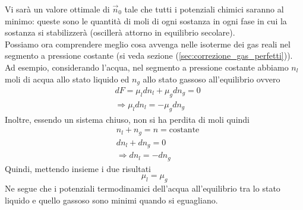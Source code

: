 \documentclass[10pt,a4paper]{article}
\begin{document}
Vi sarà un valore ottimale di $\vec{n}_0$ tale che tutti i potenziali chimici saranno al minimo: queste sono le quantità di moli di ogni sostanza in ogni fase in cui la sostanza si stabilizzerà (oscillerà attorno in equilibrio secolare).\\
Possiamo ora comprendere meglio cosa avvenga nelle isoterme dei gas reali nel segmento a pressione costante (si veda sezione (\ref{sec:correzione_gas_perfetti})). Ad esempio, considerando l'acqua, nel segmento a pressione costante abbiamo \(n_l\) moli di acqua allo stato liquido ed \(n_g\) allo stato gassoso all'equilibrio ovvero 
\begin{align*}
	&dF= \mu_l dn_l+ \mu_g dn_g = 0\\
	&\Rightarrow \mu_l dn_l = -\mu_g dn_g
\end{align*}
Inoltre, essendo un sistema chiuso, non si ha perdita di moli quindi 
\begin{align*}
	&n_l + n_g = n = \text{costante}\\
	&dn_l + dn_g = 0\\
	&\Rightarrow dn_l = -dn_g
\end{align*}
Quindi, mettendo insieme i due risultati
\[\mu_l = \mu_g\]
Ne segue che i potenziali termodinamici dell'acqua all'equilibrio tra lo stato liquido e quello gassoso sono minimi quando si eguagliano.
\end{document}
